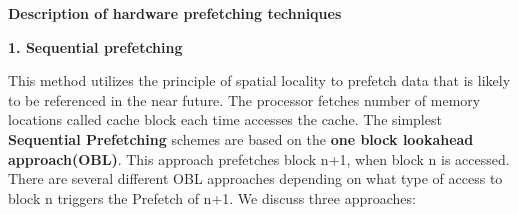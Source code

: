 \documentclass[12pt]{article}
\begin{document}
\vspace{\baselineskip}
{\fontsize{20pt}{24.0pt}\selectfont \textbf{\textcolor[HTML]{222222}{Description of hardware prefetching techniques}}\par}\par


\vspace{\baselineskip}
{\fontsize{18pt}{21.6pt}\selectfont \textbf{\textcolor[HTML]{222222}{1. Sequential prefetching}}\par}\par


\vspace{\baselineskip}
{\fontsize{15pt}{18.0pt}\selectfont \textcolor[HTML]{222222}{This method utilizes the principle of spatial locality to prefetch data that is likely to be referenced in the near future. The processor fetches number of memory locations called cache block each time accesses the cache. The simplest \textbf{Sequential Prefetching} schemes are based on the \textbf{one block lookahead approach(OBL)}. This approach prefetches block n+1, when block n is accessed. There are several different OBL approaches depending on what type of access to block n triggers the Prefetch of n+1. We discuss three approaches:}\par}\par
\end{document}
